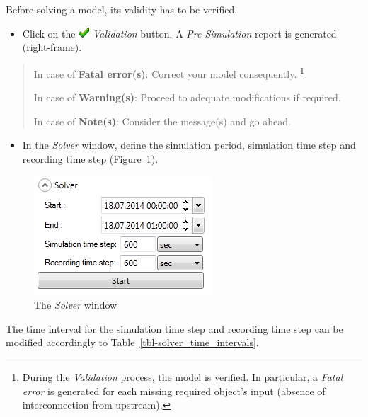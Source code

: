 \documentclass[
  letterpaper,
  DIV=11,
  numbers=noendperiod]{scrreprt}
\providecommand{\tightlist}{%
  \setlength{\itemsep}{0pt}\setlength{\parskip}{0pt}}\usepackage{longtable,booktabs,array}
\begin{document}
Before solving a model, its validity has to be verified.

\begin{itemize}
\tightlist
\item
  {Click on the
  \includegraphics[width=0.159in,height=0.159in]{./figures/fig-icon_check.png}
  \emph{Validation} button. A \emph{Pre-Simulation} report is generated
  (right-frame)}.
\end{itemize}

\begin{quote}
In case of \textbf{Fatal error(s)}: Correct your model consequently.
\footnote{During the \emph{Validation} process, the model is verified.
  In particular, a \emph{Fatal error} is generated for each missing
  required object's input (absence of interconnection from upstream).}

In case of \textbf{Warning(s)}: Proceed to adequate modifications if
required.

In case of \textbf{Note(s)}: Consider the message(s) and go ahead.
\end{quote}

\begin{itemize}
\tightlist
\item
  {In the \emph{Solver} window, define the simulation period, simulation
  time step and recording time step (Figure~\ref{fig-solver_window})}.
\end{itemize}

\begin{figure}

{\centering \includegraphics{./figures/fig-solver_window.png}

}

\caption{\label{fig-solver_window}The \emph{Solver} window}

\end{figure}

The time interval for the simulation time step and recording time step
can be modified accordingly to Table~\ref{tbl-solver_time_intervals}.
\end{document}
